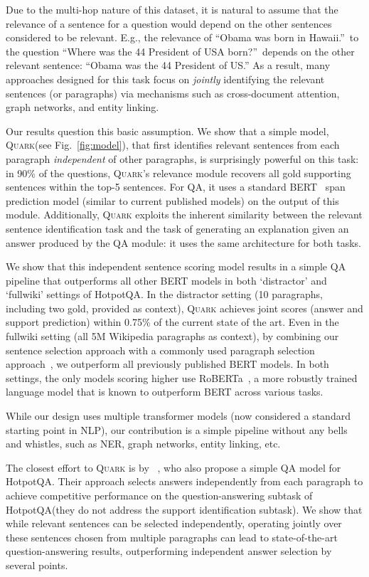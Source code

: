 \documentclass[11pt,a4paper]{article}
\newcommand\model{\textsc{Quark}\xspace}
\newcommand{\hpqa}{HotpotQA\xspace}
\newcommand{\roberta}{RoBERTa\xspace}
\newcommand{\namecite}[1]{\citeauthor{#1}~\shortcite{#1}}
\begin{document}
Due to the multi-hop nature of this dataset, it is natural to assume that the relevance of a sentence for a question would depend on the other sentences considered to be relevant. E.g., the relevance of ``Obama was born in Hawaii.''\ to the question ``Where was the 44 President of USA born?''\ depends on the other relevant sentence: ``Obama was the 44 President of US.'' As a result, many approaches designed for this task focus on \emph{jointly} identifying the relevant sentences (or paragraphs) via mechanisms such as cross-document attention, graph networks, and entity linking.

Our results question this basic assumption. We show that a simple model, \model (see Fig.~\ref{fig:model}), that first identifies relevant sentences from each paragraph \emph{independent} of other paragraphs, is surprisingly powerful on this task: in 90\% of the questions, \model's relevance module recovers all gold supporting sentences within the top-5 sentences. For QA, it uses a standard BERT~\cite{devlin2018bert} span prediction model (similar to current published models) on the output of this module. Additionally, \model exploits the inherent similarity between the relevant sentence identification task and the task of generating an explanation given an answer produced by the QA module: it uses the same architecture for both tasks. 

We show that this independent sentence scoring model results in a simple QA pipeline that outperforms all other BERT models in both `distractor' and `fullwiki' settings of \hpqa. In the distractor setting (10 paragraphs, including two gold, provided as context), \model achieves joint scores (answer and support prediction) within 0.75\% of the current state of the art. Even in the fullwiki setting (all 5M Wikipedia paragraphs as context), by combining our sentence selection approach with a commonly used paragraph selection approach~\cite{semanticmrs}, we outperform all previously published BERT models. In both settings, the only models scoring higher use \roberta~\cite{roberta}, a more robustly trained language model that is known to outperform BERT across various tasks. 

While our design uses multiple transformer models (now considered a standard starting point in NLP), our contribution is a simple pipeline without any bells and whistles, such as NER, graph networks, entity linking, etc.

The closest effort to \model is by \namecite{Min2019CompositionalQD}, who also propose a simple QA model for \hpqa. Their approach selects answers independently from each paragraph to achieve competitive performance on the question-answering subtask of \hpqa (they do not address the support identification subtask). We show that while relevant sentences can be selected independently, operating jointly over these sentences chosen from multiple paragraphs can lead to state-of-the-art question-answering results, outperforming independent answer selection by several points.
\end{document}
